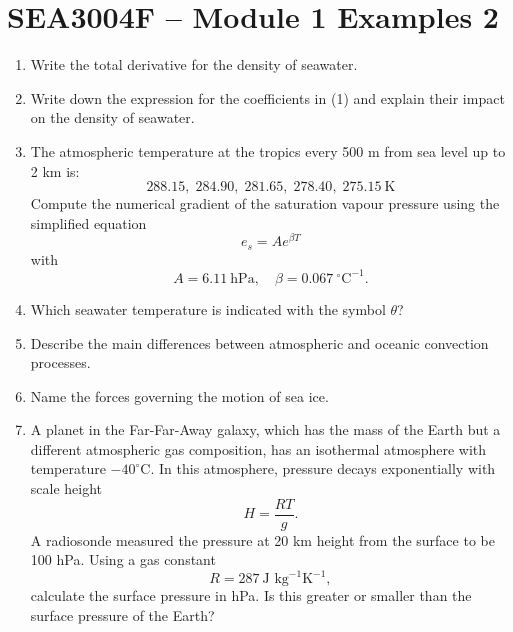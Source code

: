 \documentclass{article}
\begin{document}
\section*{SEA3004F -- Module 1 Examples 2}

\begin{enumerate}
    \item Write the total derivative for the density of seawater.
    
    \item Write down the expression for the coefficients in (1) and explain their impact on the density of seawater.
    
    \item The atmospheric temperature at the tropics every 500 m from sea level up to 2 km is:
    \[
    288.15,\; 284.90,\; 281.65,\; 278.40,\; 275.15 \ \text{K}
    \]
    Compute the numerical gradient of the saturation vapour pressure using the simplified equation
    \[
    e_s = A e^{\beta T}
    \]
    with
    \[
    A = 6.11 \ \text{hPa}, \quad \beta = 0.067 \ ^\circ\text{C}^{-1}.
    \]
    
    \item Which seawater temperature is indicated with the symbol $\theta$?
    
    \item Describe the main differences between atmospheric and oceanic convection processes.
    
    \item Name the forces governing the motion of sea ice.
    
    \item A planet in the Far-Far-Away galaxy, which has the mass of the Earth but a different atmospheric gas composition, has an isothermal atmosphere with temperature $-40^\circ$C. In this atmosphere, pressure decays exponentially with scale height
    \[
    H = \frac{RT}{g}.
    \]
    A radiosonde measured the pressure at 20 km height from the surface to be 100 hPa. Using a gas constant
    \[
    R = 287 \ \text{J kg}^{-1} \text{K}^{-1},
    \]
    calculate the surface pressure in hPa. Is this greater or smaller than the surface pressure of the Earth?
    
\end{enumerate}
\end{document}
